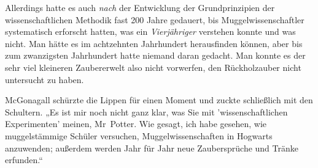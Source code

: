 Allerdings hatte es auch \emph{nach} der Entwicklung der Grundprinzipien der wissenschaftlichen Methodik fast 200 Jahre gedauert, bis Muggelwissenschaftler systematisch erforscht hatten, was ein \emph{Vierjähriger} verstehen konnte und was nicht. Man hätte es im achtzehnten Jahrhundert herausfinden können, aber bis zum zwanzigsten Jahrhundert hatte niemand daran gedacht. Man konnte es der sehr viel kleineren Zaubererwelt also nicht vorwerfen, den Rückholzauber nicht untersucht zu haben.

McGonagall schürzte die Lippen für einen Moment und zuckte schließlich mit den Schultern. „Es ist mir noch nicht ganz klar, was Sie mit 'wissenschaftlichen Experimenten' meinen, Mr~Potter. Wie gesagt, ich habe gesehen, wie muggelstämmige Schüler versuchen, Muggelwissenschaften in Hogwarts anzuwenden; außerdem werden Jahr für Jahr neue Zaubersprüche und Tränke erfunden.“

